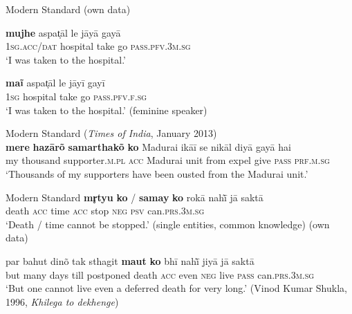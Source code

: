 \documentclass[output=paper]{LSP/langsci}
\begin{document}
\ea Modern Standard  (own data)
\label{10-mo-ex:18}

\ea \label{10-mo-ex:18a}
\gll \textbf{mujhe} aspat̩āl le jāyā gayā\\
\textsc{1sg.acc/dat} hospital take go \textsc{pass.pfv.3m.sg}\\
\glt ‘I was taken to the hospital.’

\ex \label{10-mo-ex:18b}
\gll \textbf{maĩ} aspat̩āl le jāyī gayī\\
\textsc{1sg} hospital take go \textsc{pass.pfv.f.sg}\\
\glt ‘I was taken to the hospital.’ (feminine speaker)
\z
\z


\ea Modern Standard  (\textit{Times of India}, January 2013)\\
\label{10-mo-ex:20}
 \gll \textbf{mere} \textbf{hazārõ} \textbf{samarthakõ} \textbf{ko} Madurai ikāī se nikāl diyā gayā hai\\
 my thousand supporter.\textsc{m.pl} \textsc{acc} Madurai unit from expel give \textsc{pass} \textsc{prf.m.sg}\\
\glt ‘Thousands of my supporters have been ousted from the Madurai unit.’
\z


\ea Modern Standard 
\label{10-mo-ex:21}
\ea
\gll \textbf{mr̥tyu} \textbf{ko} / \textbf{samay} \textbf{ko} rokā 	nahī̃ 	jā saktā\\
 death \textsc{acc} { } time \textsc{acc} stop \textsc{neg} \textsc{psv} can.\textsc{prs.3m.sg}\\
\glt ‘Death / time cannot be stopped.’ (single entities, common knowledge) (own data)

\ex
\gll par bahut dinõ tak sthagit \textbf{maut} \textbf{ko} bhī nahī̃ jiyā jā saktā\\
 but many days till postponed death \textsc{acc} even \textsc{neg} live \textsc{pass} can.\textsc{prs.3m.sg}\\
\glt ‘But one cannot live even a deferred death for very long.’ (Vinod Kumar Shukla, 1996, \emph{Khilega to dekhenge})
\end{document}
